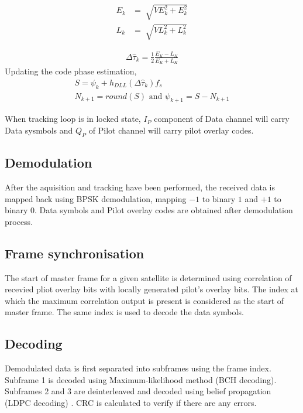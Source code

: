 \documentclass[conference]{IEEEtran}
\begin{document}
\begin{align}
	E_k&=\sqrt[]{VE_k^2+E_k^2}\\
	L_k&=\sqrt[]{VL_k^2+L_k^2}
\end{align}

\begin{align}
	\Delta \hat{\tau}_k = \frac{1}{2}\frac{E_K-L_K}{E_K+L_K}
\end{align}
Updating the code phase estimation, 
\begin{multline}
	S = \psi_k + h_{DLL}(\Delta \hat{\tau}_k )f_s \\
	N_{k+1} = round (S) \text{  and  } \psi_{k+1} = S - N_{k+1}
\end{multline}


\noindent When tracking loop is in locked state, $I_P$ component of Data channel will carry Data 
sysmbols and $Q_P$ of Pilot channel will carry pilot overlay codes.

\subsection{Demodulation}
After the aquisition and tracking have been performed, the received data is mapped back using BPSK 
demodulation, mapping $-1$ to binary $1$ and $+1$ to binary $0$. Data symbols and Pilot 
overlay codes are obtained after demodulation process.

\subsection{Frame synchronisation}
The start of master frame for a given satellite is determined using correlation of 
recevied pliot overlay bits with locally generated pilot's overlay bits. The index at which the 
maximum correlation output is present is considered as the start of master frame. The same
index is used to decode the data symbols.

\subsection{Decoding}
Demodulated data is first separated into subframes using the frame index. Subframe 1 is decoded 
using Maximum-likelihood method (BCH decoding). Subframes 2 and 3 are deinterleaved and decoded 
using belief propagation (LDPC decoding) \cite{b6}. CRC is calculated to verify if there are any errors. 
\end{document}
